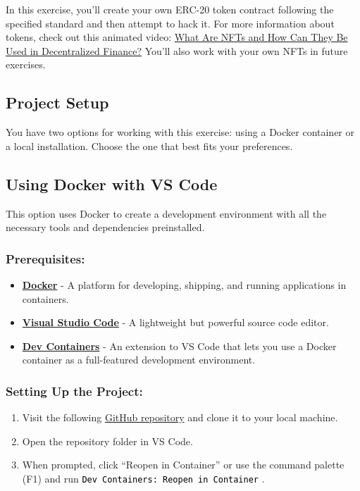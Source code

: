 \documentclass[12pt]{article}
\newcommand{\codegrey}[1]{%
  \texttt{\colorbox{black!4}{\textcolor{black}{#1}}}%
}
\begin{document}
In this exercise, you'll create your own ERC-20 token contract following the specified standard and then attempt to hack it. For more information about tokens, check out this animated video: \href{https://www.youtube.com/watch?v=Xdkkux6OxfM}{What Are NFTs and How Can They Be Used in Decentralized Finance?} You'll also work with your own NFTs in future exercises.

\subsection*{Project Setup}

You have two options for working with this exercise: using a Docker container or a local installation. Choose the one that best fits your preferences.

\subsection{Using Docker with VS Code}

This option uses Docker to create a development environment with all the necessary tools and dependencies preinstalled.

\subsubsection*{Prerequisites:}

\begin{itemize}
    \item \textbf{\href{https://www.docker.com/products/docker-desktop}{Docker}} - A platform for developing, shipping, and running applications in containers.
    \item \textbf{\href{https://code.visualstudio.com/}{Visual Studio Code}} - A lightweight but powerful source code editor.
    \item \textbf{\href{https://marketplace.visualstudio.com/items?itemName=ms-vscode-remote.remote-containers}{Dev Containers}} - An extension to VS Code that lets you use a Docker container as a full-featured development environment.
\end{itemize}

\subsubsection*{Setting Up the Project:}

\begin{enumerate}
  \item Visit the following \href{https://github.com/radovluk/Smart-Contract-Exercise/tree/main/03-ERC20-CTUToken/task/task-code}{GitHub repository} and clone it to your local machine.
  \item Open the repository folder in VS Code.
  \item When prompted, click ``Reopen in Container'' or use the command palette (F1) and run \codegrey{Dev Containers: Reopen in Container}.
\end{enumerate}
\end{document}
